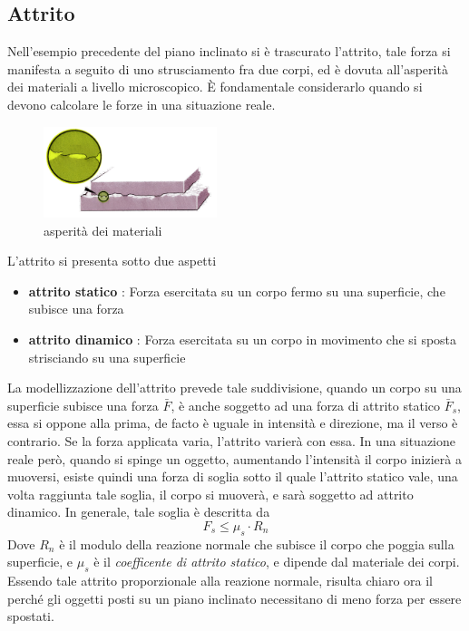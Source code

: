 \documentclass[10pt, letterpaper]{report}
\begin{document}
\subsection{Attrito}
Nell'esempio precedente del piano inclinato si è trascurato l'attrito, tale forza si manifesta a seguito di uno 
strusciamento fra due corpi, ed è dovuta all'asperità dei materiali a livello microscopico. È fondamentale considerarlo 
quando si devono calcolare le forze in una situazione reale.\\
\begin{figure}[h!]
    \centering
    \includegraphics[width=0.45\textwidth]{images/attrito}
    \caption{asperità dei materiali}
\end{figure}\acc
L'attrito si presenta sotto due aspetti\begin{itemize}
    \item \textbf{attrito statico} : Forza esercitata su un corpo fermo su una superficie, che subisce una forza 
    \item \textbf{attrito dinamico} : Forza esercitata su un corpo in movimento che si sposta strisciando su una superficie
\end{itemize}
La modellizzazione dell'attrito prevede tale suddivisione, quando un corpo su una superficie subisce 
una forza $\bar F$, è anche soggetto ad una forza di attrito statico $\bar F_s$, essa si oppone alla prima, 
de facto è uguale in intensità e direzione, ma il verso è contrario. Se la forza applicata varia, l'attrito 
varierà con essa.\acc 
In una situazione reale però, quando si spinge un oggetto, aumentando l'intensità il corpo inizierà a muoversi, 
esiste quindi una forza di soglia sotto il quale l'attrito statico vale, una volta raggiunta tale soglia, 
il corpo si muoverà, e sarà soggetto ad attrito dinamico. In generale, tale soglia è descritta da 
$$ F_s\le \mu_s\cdot R_n$$
Dove $R_n$ è il modulo della reazione normale che subisce il corpo che poggia sulla superficie, e 
$\mu_s$ è il \textit{coefficente di attrito statico}, e dipende dal materiale dei corpi. Essendo tale attrito 
proporzionale alla reazione normale, risulta chiaro ora il perché gli oggetti posti su un piano inclinato necessitano
 di meno forza per essere spostati.\acc 
\end{document}
